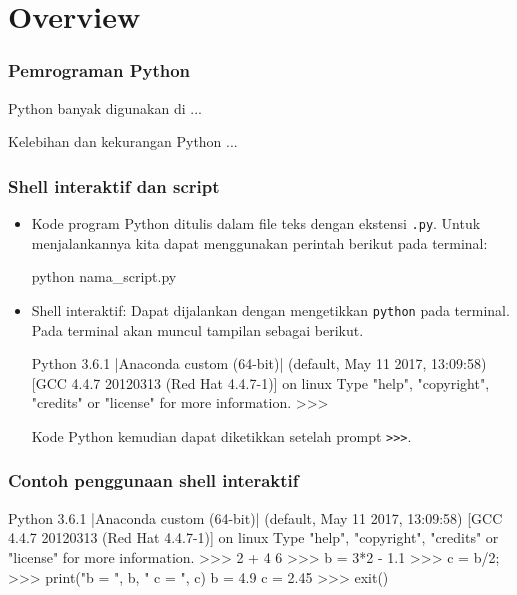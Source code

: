 \section{Overview}

\begin{frame}
\frametitle{Pemrograman Python}

Python banyak digunakan di ...

Kelebihan dan kekurangan Python ...

\end{frame}


\begin{frame}[fragile]
\frametitle{Shell interaktif dan script}

\begin{itemize}

  \item Kode program Python ditulis dalam file teks dengan ekstensi \texttt{.py}.
  Untuk menjalankannya kita dapat menggunakan perintah berikut pada terminal:
\begin{bashcode}
python nama_script.py
\end{bashcode}

  \item Shell interaktif: Dapat dijalankan dengan mengetikkan \texttt{python} pada
  terminal. Pada terminal akan muncul tampilan sebagai berikut.
\begin{textcode}
Python 3.6.1 |Anaconda custom (64-bit)| (default, May 11 2017, 13:09:58) 
[GCC 4.4.7 20120313 (Red Hat 4.4.7-1)] on linux
Type "help", "copyright", "credits" or "license" for more information.
>>>
\end{textcode}
  Kode Python kemudian dapat diketikkan setelah prompt \texttt{>>>}.

\end{itemize}

\end{frame}


\begin{frame}[fragile]
\frametitle{Contoh penggunaan shell interaktif}

\begin{textcode}
Python 3.6.1 |Anaconda custom (64-bit)| (default, May 11 2017, 13:09:58) 
[GCC 4.4.7 20120313 (Red Hat 4.4.7-1)] on linux
Type "help", "copyright", "credits" or "license" for more information.
>>> 2 + 4
6
>>> b = 3*2 - 1.1
>>> c = b/2;
>>> print("b = ", b, " c = ", c)
b =  4.9  c =  2.45
>>> exit()
\end{textcode}

\end{frame}


